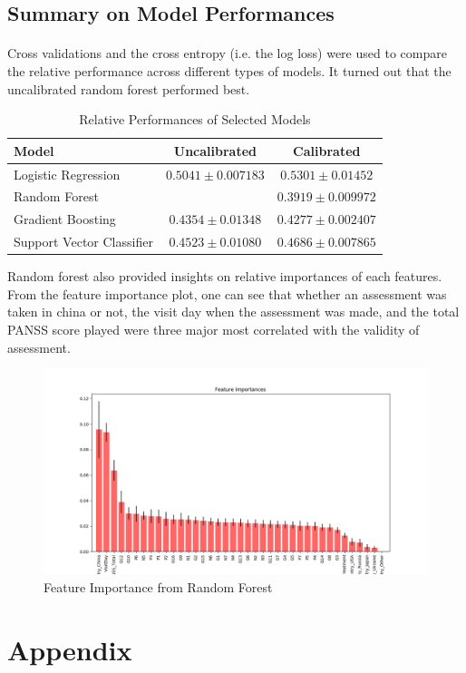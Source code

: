 \documentclass[11pt]{article}
\begin{document}
 	\subsection{Summary on Model Performances}
 	\paragraph{} Cross validations and the cross entropy (i.e. the log loss) were used to compare the relative performance across different types of models. It turned out that the uncalibrated random forest performed best.
 	
 	\begin{table}[H]
 		\centering
 		\begin{tabular}{l|c|c}
 			Model & Uncalibrated & Calibrated \\
 			\hline 
 			Logistic Regression & $0.5041 \pm 0.007183$ & $0.5301 \pm 0.01452$\\
 			Random Forest & \red{$0.3689 \pm 0.008212$} & $0.3919 \pm 0.009972$\\
 			Gradient Boosting & $0.4354 \pm 0.01348$ & $0.4277 \pm 0.002407$\\
 			Support Vector Classifier & $0.4523 \pm 0.01080$ & $0.4686 \pm 0.007865$ \\
 		\end{tabular}
 		\caption{Relative Performances of Selected Models}
 	\end{table}
 	
 	Random forest also provided insights on relative importances of each features. From the feature importance plot, one can see that whether an assessment was taken in china or not, the visit day when the assessment was made, and the total PANSS score played were three major most correlated with the validity of assessment.
 	\begin{figure}[H]
 		\centering
 		\includegraphics[width=0.9\linewidth]{figures/classification_feature_importance.png}
 		\caption{Feature Importance from Random Forest}
 	\end{figure}
 	
	\section{Appendix}
\end{document}
